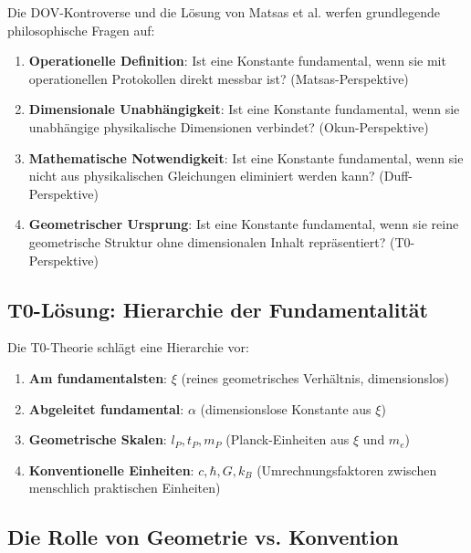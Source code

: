 	Die DOV-Kontroverse und die Lösung von Matsas et al. werfen grundlegende philosophische Fragen auf:
	
	\begin{enumerate}
		\item \textbf{Operationelle Definition}: Ist eine Konstante fundamental, wenn sie mit operationellen Protokollen direkt messbar ist? (Matsas-Perspektive)
		
		\item \textbf{Dimensionale Unabhängigkeit}: Ist eine Konstante fundamental, wenn sie unabhängige physikalische Dimensionen verbindet? (Okun-Perspektive)
		
		\item \textbf{Mathematische Notwendigkeit}: Ist eine Konstante fundamental, wenn sie nicht aus physikalischen Gleichungen eliminiert werden kann? (Duff-Perspektive)
		
		\item \textbf{Geometrischer Ursprung}: Ist eine Konstante fundamental, wenn sie reine geometrische Struktur ohne dimensionalen Inhalt repräsentiert? (T0-Perspektive)
	\end{enumerate}
	
	\subsection{T0-Lösung: Hierarchie der Fundamentalität}
	
	Die T0-Theorie schlägt eine Hierarchie vor:
	
	\begin{enumerate}
		\item \textbf{Am fundamentalsten}: $\xi$ (reines geometrisches Verhältnis, dimensionslos)
		
		\item \textbf{Abgeleitet fundamental}: $\alpha$ (dimensionslose Konstante aus $\xi$)
		
		\item \textbf{Geometrische Skalen}: $l_P, t_P, m_P$ (Planck-Einheiten aus $\xi$ und $m_e$)
		
		\item \textbf{Konventionelle Einheiten}: $c, \hbar, G, k_B$ (Umrechnungsfaktoren zwischen menschlich praktischen Einheiten)
	\end{enumerate}
	
	\subsection{Die Rolle von Geometrie vs. Konvention}
	
